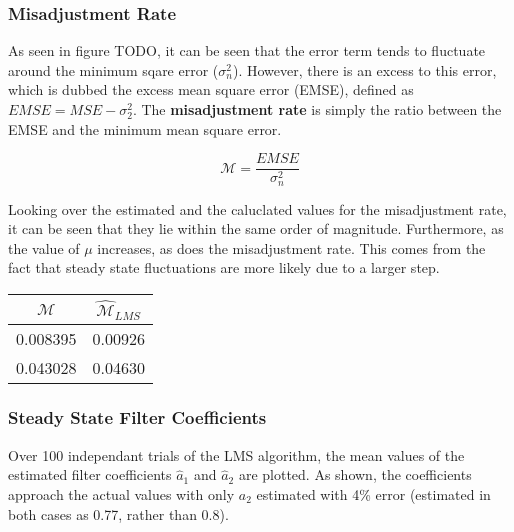 \documentclass[main.tex]{subfiles}
\begin{document}
\subsubsection{Misadjustment Rate}


As seen in figure TODO, it can be seen that the error term tends to fluctuate around the minimum sqare error ($\sigma_n^2$). However, there is an excess to this error, which is dubbed the excess mean square error (EMSE), defined as $EMSE = MSE - \sigma_2^2$. The \textbf{misadjustment rate} is simply the ratio between the EMSE and the minimum mean square error.

\begin{equation*}
\mathcal{M} = \frac{EMSE}{\sigma_n^2}
\end{equation*}

Looking over the estimated and the caluclated values for the misadjustment rate, it can be seen that they lie within the same order of magnitude. Furthermore, as the value of $\mu$ increases, as does the misadjustment rate. This comes from the fact that steady state fluctuations are more likely due to a larger step.

\begin{table}[h]
	\centering
	\begin{tabular}{ | c |  c | }
		\hline
		$\mathcal{M}$ & $\hat{\mathcal{M}}_{LMS} $ \\ \hline
		0.008395      & 0.00926                   \\ \hline
		0.043028      & 0.04630                  \\ \hline
	\end{tabular}
\end{table}










\subsubsection{Steady State Filter Coefficients}

Over 100 independant trials of the LMS algorithm, the mean values of the estimated filter coefficients $\hat{a}_1$ and $\hat{a}_2$ are plotted. As shown, the coefficients approach the actual values with only $a_2$ estimated with 4\% error (estimated in both cases as 0.77, rather than 0.8).
\end{document}
